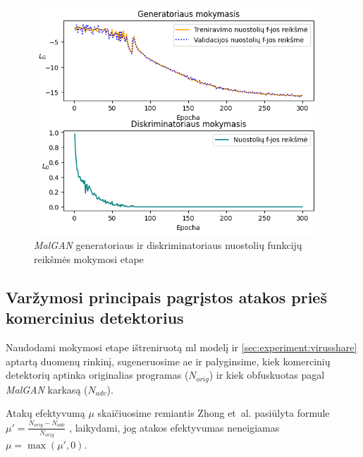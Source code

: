 \begin{figure}[h]
    \begin{small}
        \begin{center}
            \includegraphics[width=0.95\textwidth]{img/learning.png}
        \end{center}
        \caption{\textit{MalGAN} generatoriaus ir diskriminatoriaus nuostolių funkcijų reikšmės mokymosi etape}\label{fig:experiment:learning}
    \end{small}
\end{figure}

\subsection{Varžymosi principais pagrįstos atakos prieš komercinius detektorius}

Naudodami mokymosi etape ištreniruotą \acs{ml} modelį ir
\ref{sec:experiment:virusshare} aptartą duomenų rinkinį, sugeneruosime \acs{ae}
ir palyginsime, kiek komercinių detektorių aptinka originalias programas
($N_{orig}$) ir kiek obfuskuotas pagal \textit{MalGAN} karkasą ($N_{adv}$).

Atakų efektyvumą $\mu$ skaičiuosime remiantis Zhong et~al. pasiūlyta formule
$\mu' = \frac{N_{orig} - N_{adv}}{N_{orig}}$
\cite{zhongMalFoxCamouflagedAdversarial2024}, laikydami, jog atakos efektyvumas
neneigiamas $\mu = \max{(\mu', 0)}$.

